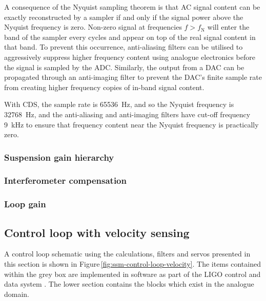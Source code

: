 A consequence of the Nyquist sampling theorem is that \gls{AC} signal content can be exactly reconstructed by a sampler if and only if the signal power above the Nyquist frequency is zero. Non-zero signal at frequencies $f > f_{\text{N}}$ will enter the band of the sampler every  cycles and appear on top of the real signal content in that band. To prevent this occurrence, anti-aliasing filters can be utilised to aggressively suppress higher frequency content using analogue electronics before the signal is sampled by the \gls{ADC}. Similarly, the output from a \gls{DAC} can be propagated through an anti-imaging filter to prevent the \gls{DAC}'s finite sample rate from creating higher frequency copies of in-band signal content.

With \gls{CDS}, the sample rate is \SI{65536}{\hertz}, and so the Nyquist frequency is \SI{32768}{\hertz}, and the anti-aliasing and anti-imaging filters have cut-off frequency \SI{9}{\kilo\hertz} to ensure that frequency content near the Nyquist frequency is practically zero.


\subsubsection{Suspension gain hierarchy}


\subsubsection{Interferometer compensation}

\subsubsection{Loop gain}

\subsection{Control loop with velocity sensing}

A control loop schematic using the calculations, filters and servos presented in this section is shown in Figure\,\ref{fig:ssm-control-loop-velocity}. The items contained within the grey box are implemented in software as part of the LIGO control and data system \cite{Bork2010}. The lower section contains the blocks which exist in the analogue domain.

